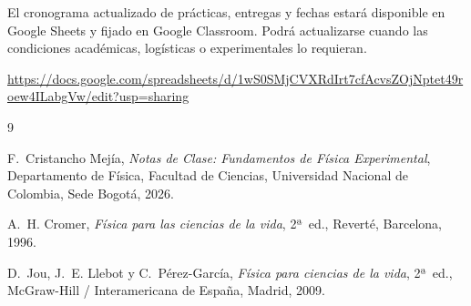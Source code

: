 \documentclass[11pt, letterpaper]{article}
\begin{document}
El cronograma actualizado de prácticas, entregas y fechas estará
disponible en Google Sheets y fijado en Google Classroom. Podrá
actualizarse cuando las condiciones académicas, logísticas o
experimentales lo requieran.

\url{https://docs.google.com/spreadsheets/d/1wS0SMjCVXRdIrt7cfAcvsZOjNptet49roew4ILabgVw/edit?usp=sharing}

\begin{thebibliography}{9}

F.~Cristancho Mejía,
\textit{Notas de Clase: Fundamentos de Física Experimental},
Departamento de Física, Facultad de Ciencias,
Universidad Nacional de Colombia, Sede Bogotá, 2026.

A.~H. Cromer,
\textit{Física para las ciencias de la vida},
2ª~ed., Reverté, Barcelona, 1996.

D.~Jou, J.~E. Llebot y C.~Pérez-García,
\textit{Física para ciencias de la vida},
2ª~ed., McGraw-Hill / Interamericana de España, Madrid, 2009.

\end{thebibliography}
\end{document}
